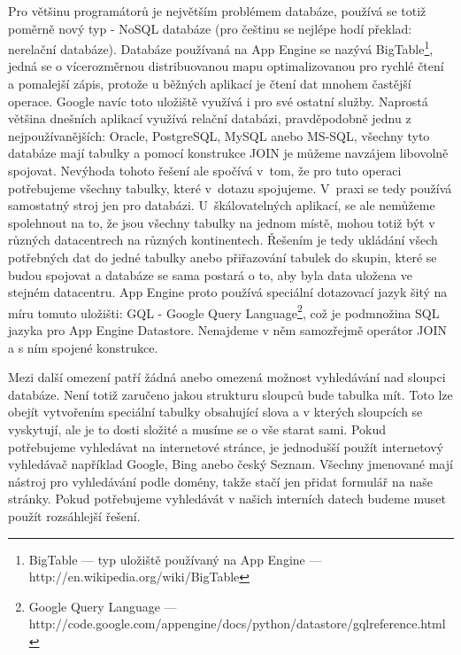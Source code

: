 Pro většinu programátorů je největším problémem databáze, používá se totiž poměrně nový typ - NoSQL databáze (pro češtinu se nejlépe hodí překlad: nerelační databáze). Databáze používaná na App Engine se nazývá BigTable\footnote{BigTable --- typ uložiště používaný na App Engine --- http://en.wikipedia.org/wiki/BigTable}, jedná se o vícerozměrnou distribuovanou mapu optimalizovanou pro rychlé čtení a pomalejší zápis, protože u běžných aplikací je čtení dat mnohem častější operace. Google navíc toto uložiště využívá i pro své ostatní služby. Naprostá většina dnešních aplikací využívá relační databázi, pravděpodobně jednu z nejpoužívanějších: Oracle, PostgreSQL, MySQL anebo MS-SQL, všechny tyto databáze mají tabulky a pomocí konstrukce JOIN je můžeme navzájem libovolně spojovat. Nevýhoda tohoto řešení ale spočívá v~tom, že pro tuto operaci potřebujeme všechny tabulky, které v~dotazu spojujeme. V~praxi se tedy používá samostatný stroj jen pro databázi. U~škálovatelných aplikací, se ale nemůžeme spolehnout na to, že jsou všechny tabulky na jednom místě, mohou totiž být v různých datacentrech na různých kontinentech. Řešením je tedy ukládání všech potřebných dat do jedné tabulky anebo přiřazování tabulek do skupin, které se budou spojovat a databáze se sama postará o to, aby byla data uložena ve stejném datacentru. App Engine proto používá speciální dotazovací jazyk šitý na míru tomuto uložišti: GQL - Google Query Language\footnote{Google Query Language --- http://code.google.com/appengine/docs/python/datastore/gqlreference.html},
což je podmnožina SQL jazyka pro App Engine Datastore. Nenajdeme v něm samozřejmě operátor JOIN a s ním spojené konstrukce.

Mezi další omezení patří žádná anebo omezená možnost vyhledávání nad sloupci databáze. Není totiž zaručeno jakou strukturu sloupců bude tabulka mít. Toto lze obejít vytvořením speciální tabulky obsahující slova a v kterých sloupcích se vyskytují, ale je to dosti složité a musíme se o vše starat sami. Pokud potřebujeme vyhledávat na internetové stránce, je jednodušší použít internetový vyhledávač například Google, Bing anebo český Seznam. Všechny jmenované mají nástroj pro vyhledávání podle domény, takže stačí jen přidat formulář na naše stránky. Pokud potřebujeme vyhledávát v našich interních datech budeme muset použít rozsáhlejší řešení.

